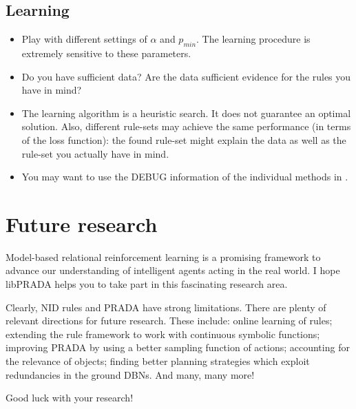 \documentclass[10pt,twoside,twocolumn,fleqn]{article}
\begin{document}
\subsection{Learning}
\begin{itemize}
\item Play with different settings of $\alpha$ and $p_{min}$. The learning
procedure is extremely sensitive to these parameters.

\item Do you have sufficient data? Are the data sufficient evidence for
the rules you have in mind?

\item The learning algorithm is a heuristic search. It does not guarantee
an optimal solution. Also, different rule-sets may achieve the same
performance (in terms of the loss function): the found rule-set might
explain the data as well as the rule-set you actually have in mind.

\item You may want to use the DEBUG information of the individual methods
in .
\end{itemize}









\section{Future research}

Model-based relational reinforcement learning is a promising framework to
advance our understanding of intelligent agents acting in the real world. I
hope libPRADA helps you to take part in this fascinating research area.

Clearly, NID rules and PRADA have strong limitations. There are plenty of
relevant directions for future research. These include: online learning of
rules; extending the rule framework to work with continuous symbolic
functions; improving PRADA by using a better sampling function of actions;
accounting for the relevance of objects; finding better planning strategies
which exploit redundancies in the ground DBNs. And many, many more!

Good luck with your research!






\end{document}
